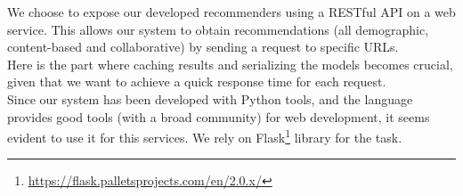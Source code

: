 We choose to expose our developed recommenders using a RESTful API on a web service.
This allows our system to obtain recommendations (all demographic, content-based and collaborative) by sending a request to specific URLs.\\
Here is the part where caching results and serializing the models becomes crucial, given that we want to achieve a quick response time for each request.\\
Since our system has been developed with Python tools, and the language provides good tools (with a broad community) for web development, it seems evident to use it for this services.
We rely on Flask\footnote{\href{https://flask.palletsprojects.com/en/2.0.x/}{https://flask.palletsprojects.com/en/2.0.x/}} library for the task.